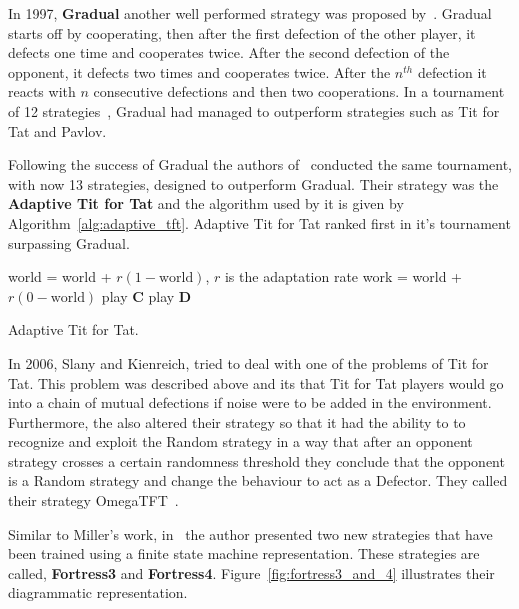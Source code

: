 \documentclass{article}
\theoremstyle{definition}
\begin{document}

In 1997, \textbf{Gradual} another well performed strategy
was proposed by~\cite{Beaufils1997}. Gradual starts off by cooperating,
then after the first defection of the other player, it defects one time and cooperates
twice. After the second defection of the opponent, it defects two times and cooperates
twice. After the \(n^{th}\) defection it reacts with \(n\) consecutive defections 
and then two cooperations. In a tournament of 12 strategies~\cite{Beaufils1997},
Gradual had managed to outperform strategies such as Tit for Tat and Pavlov.

Following the success of Gradual the authors of~\cite{tzafestas-2000a} conducted
the same tournament, with now 13 strategies, designed to outperform Gradual. Their strategy
was the \textbf{Adaptive Tit for Tat} and the algorithm used by it is given by
Algorithm~\ref{alg:adaptive_tft}. Adaptive Tit for Tat ranked first in it's tournament
surpassing Gradual.

\begin{algorithm}
\begin{algorithmic}
     \STATE world = world + \(r(1-\text{world})\), \(r\) is the adaptation rate
    \ELSE
     \STATE work = world + \(r(0 - \text{world})\)
     \ENDIF
        \STATE play \textbf{C}
    \ELSE
    \STATE play \textbf{D}
    \ENDIF
\end{algorithmic}
\caption{Adaptive Tit for Tat.}
\label{alg:adaptive_tft}
\end{algorithm}

In 2006, Slany and Kienreich, tried to deal with one of the problems of Tit for Tat.
This problem was described above and its that Tit for Tat players would go into
a chain of mutual defections if noise were to be added in the environment.
Furthermore, the also altered their strategy so that it had the ability to
to recognize and exploit the Random strategy in a way that after an opponent
strategy crosses a certain randomness threshold they conclude that the opponent is
a Random strategy and change the behaviour to act as a Defector.
They called their strategy OmegaTFT~\cite{Wolfgang2006}.

Similar to Miller's work, in~\cite{Ashlock2006b} the author presented two new
strategies that have been trained using a finite state machine representation.
These strategies are called,
\textbf{Fortress3} and \textbf{Fortress4}. Figure~\ref{fig:fortress3_and_4}
illustrates their diagrammatic representation.
\end{document}
